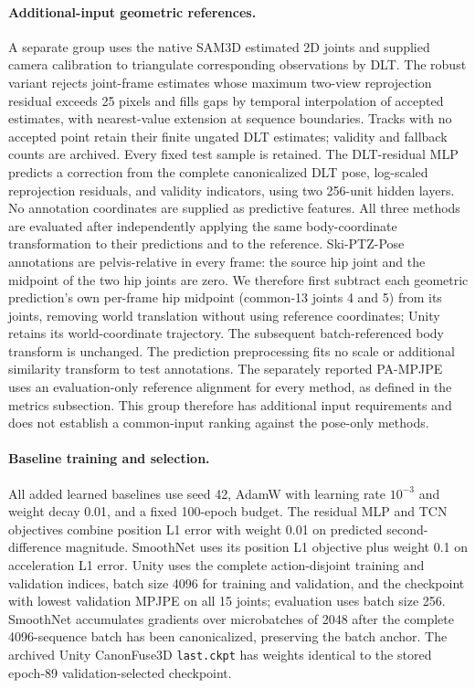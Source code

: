 \paragraph{Additional-input geometric references.}
A separate group uses the native SAM3D estimated 2D joints and supplied camera calibration to triangulate corresponding observations by DLT. The robust variant rejects joint-frame estimates whose maximum two-view reprojection residual exceeds 25 pixels and fills gaps by temporal interpolation of accepted estimates, with nearest-value extension at sequence boundaries. Tracks with no accepted point retain their finite ungated DLT estimates; validity and fallback counts are archived. Every fixed test sample is retained. The DLT-residual MLP predicts a correction from the complete canonicalized DLT pose, log-scaled reprojection residuals, and validity indicators, using two 256-unit hidden layers. No annotation coordinates are supplied as predictive features. All three methods are evaluated after independently applying the same body-coordinate transformation to their predictions and to the reference. Ski-PTZ-Pose annotations are pelvis-relative in every frame: the source hip joint and the midpoint of the two hip joints are zero. We therefore first subtract each geometric prediction's own per-frame hip midpoint (common-13 joints 4 and 5) from its joints, removing world translation without using reference coordinates; Unity retains its world-coordinate trajectory. The subsequent batch-referenced body transform is unchanged. The prediction preprocessing fits no scale or additional similarity transform to test annotations. The separately reported PA-MPJPE uses an evaluation-only reference alignment for every method, as defined in the metrics subsection. This group therefore has additional input requirements and does not establish a common-input ranking against the pose-only methods.

\paragraph{Baseline training and selection.}
All added learned baselines use seed 42, AdamW with learning rate $10^{-3}$ and weight decay 0.01, and a fixed 100-epoch budget. The residual MLP and TCN objectives combine position L1 error with weight 0.01 on predicted second-difference magnitude. SmoothNet uses its position L1 objective plus weight 0.1 on acceleration L1 error. Unity uses the complete action-disjoint training and validation indices, batch size 4096 for training and validation, and the checkpoint with lowest validation MPJPE on all 15 joints; evaluation uses batch size 256. SmoothNet accumulates gradients over microbatches of 2048 after the complete 4096-sequence batch has been canonicalized, preserving the batch anchor. The archived Unity CanonFuse3D \texttt{last.ckpt} has weights identical to the stored epoch-89 validation-selected checkpoint.

